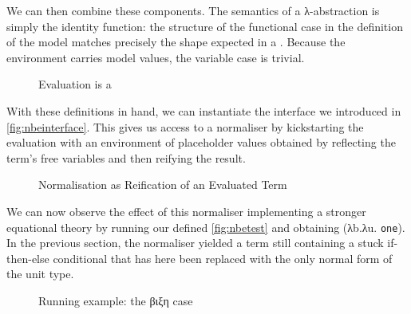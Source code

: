 We can then combine these components. The semantics of a λ-abstraction is
simply the identity function: the structure of the functional case in the
definition of the model matches precisely the shape expected in a
. Because the environment carries model values, the
variable case is trivial.

\begin{figure}[h]
\caption{Evaluation is a \label{fig:evalnbe}}
\end{figure}

With these definitions in hand, we can instantiate the  interface we
introduced in \cref{fig:nbeinterface}. This gives us access to a normaliser
by kickstarting the evaluation with an environment of placeholder values
obtained by reflecting the term's free variables and then reifying the
result.

\begin{figure}[h]
\caption{Normalisation as Reification of an Evaluated Term\label{fig:normnbe}}
\end{figure}

We can now observe the effect of this normaliser implementing a stronger
equational theory by running our  defined \cref{fig:nbetest} and
obtaining {(λb.λu. \texttt{one})}. In the previous section, the normaliser
yielded a term still containing a stuck if-then-else conditional that has
here been replaced with the only normal form of the unit type.

\begin{figure}[h]
\caption{Running example: the βιξη case}\label{fig:betaiotaxietatest}
\end{figure}
